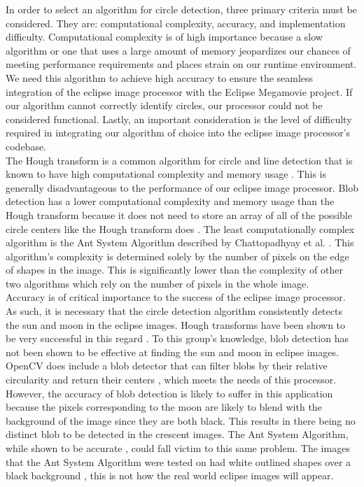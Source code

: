 \documentclass[10pt, onecolumn, draftclsnofoot, letterpaper, compsoc]{IEEEtran}
\begin{document}
In order to select an algorithm for circle detection, three primary criteria
must be considered. They are: computational complexity, accuracy, and
implementation difficulty. Computational complexity is of high importance
because a slow algorithm or one that uses a large amount of memory jeopardizes
our chances of meeting performance requirements and places strain on our runtime
environment. We need this algorithm to achieve high accuracy to ensure the
seamless integration of the eclipse image processor with the Eclipse Megamovie
project. If our algorithm cannot correctly identify circles, our processor could
not be considered functional. Lastly, an important consideration is the level of
difficulty required in integrating our algorithm of choice into the eclipse
image processor's codebase. \\


The Hough transform is a common algorithm for circle and line detection that is
known to have high computational complexity and memory usage \cite{hough,
antsystem}. This is generally disadvantageous to the performance of our eclipse
image processor. Blob detection has a lower computational complexity and memory
usage than the Hough transform because it does not need to store an array of all
of the possible circle centers like the Hough transform does \cite{hough,
blobarticle, blobref}. The least computationally complex algorithm is the Ant
System Algorithm described by Chattopadhyay et al. \cite{antsystem}. This
algorithm's complexity is determined solely by the number of pixels on the edge
of shapes in the image. This is significantly lower than the complexity of other
two algorithms which rely on the number of pixels in the whole image. \\


Accuracy is of critical importance to the success of the eclipse image
processor. As such, it is necessary that the circle detection algorithm
consistently detects the sun and moon in the eclipse images. Hough transforms
have been shown to be very successful in this regard \cite{imgKrista}. To this
group's knowledge, blob detection has not been shown to be effective at finding
the sun and moon in eclipse images. OpenCV does include a blob detector that can
filter blobs by their relative circularity and return their centers
\cite{blobarticle, blobref}, which meets the needs of this processor. However,
the accuracy of blob detection is likely to suffer in this application because
the pixels corresponding to the moon are likely to blend with the background of
the image since they are both black. This results in there being no distinct
blob to be detected in the crescent images. The Ant System Algorithm, while
shown to be accurate \cite{antsystem}, could fall victim to this same problem.
The images that the Ant System Algorithm were tested on had white outlined
shapes over a black background \cite{antsystem}, this is not how the real world
eclipse images will appear. \\
\end{document}
